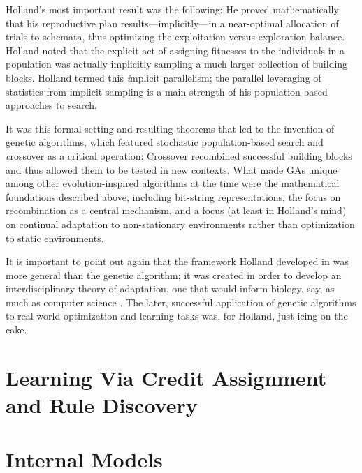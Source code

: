 \documentclass{sig-alternate}
\begin{document}
Holland's most important result was the following: He proved
mathematically that his reproductive plan results---implicitly---in a
near-optimal allocation of trials to schemata, thus optimizing the
exploitation versus exploration balance.  Holland noted that the
explicit act of assigning fitnesses to the individuals in a population
was actually implicitly sampling a much larger collection of building
blocks.  Holland termed this {\emph implicit parallelism}; the
parallel leveraging of statistics from implicit sampling is a main
strength of his population-based approaches to search.

It was this formal setting and resulting theorems that led to the
invention of genetic algorithms, which featured stochastic
population-based search and {\emph crossover} as a critical
operation: Crossover recombined successful building blocks and
thus allowed them to be tested in new contexts.  What made GAs unique
among other evolution-inspired algorithms at the time were the
mathematical foundations described above, including bit-string
representations, the focus on recombination as a central mechanism,
and a focus (at least in Holland's mind) on continual adaptation to
non-stationary environments rather than optimization to static
environments.

It is important to point out again that the framework Holland
developed in \cite{ANAS} was more general than the genetic algorithm;
it was created in order to develop an interdisciplinary theory of
adaptation, one that would inform biology, say, as much as computer
science \cite{ChristiansenFeldmanPaper}.  The later, successful
application of genetic algorithms to real-world optimization and
learning tasks was, for Holland, just icing on the cake.

\section{Learning Via Credit Assignment and Rule Discovery}

\section{Internal Models}
\end{document}
